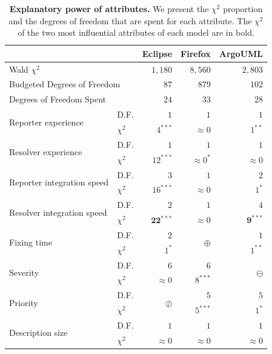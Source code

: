 \begin{table}[t]
	\scriptsize
	\centering
	\caption{\textbf{Explanatory power of attributes.} We present the
		$\chi^2$ proportion and the degrees of freedom that are spent
		for each attribute. The $\chi^2$ of the two most influential
		attributes of each model are in bold.
	\label{ch4:tbl:explanatory_power}}
	\begin{threeparttable}
		\begin{tabular}{llrrr}
			\cline{3-5} 
			\multicolumn{2}{c}{} & 
			Eclipse &
			Firefox &
			ArgoUML
			\tabularnewline
			\hline
			\multicolumn{2}{l}{Wald $\chi^2$} & 
			$1,180$ &
			$8,560$ &
			$2,803$
			\tabularnewline
			\hline 
			\multicolumn{2}{l}{Budgeted Degrees of Freedom} &
			$87$ & 
			$879$ &
			$102$
			\tabularnewline
			\hline
			\multicolumn{2}{l}{Degrees of Freedom Spent} &
			$24$ & 
			$33$ &
			$28$
			\tabularnewline
			\hline 
			\multirow{2}{*}{Reporter experience} & 
			D.F. & 
			$1$ & 
			$1$ &
			$1$
			\tabularnewline 
			& 
			$\chi^2$ & 
			$4^{\ast\ast\ast}$ &  
			$\approx 0$ &
			$1^{\ast\ast}$
			\tabularnewline
			\hline 
			\multirow{2}{*}{Resolver experience} & 
			D.F. & 
			$1$ & 
			$1$ &
			$1$
			\tabularnewline 
			& 
			$\chi^2$ & 
			$12^{\ast\ast\ast}$ & 
			$\approx 0^{\ast}$ &  
			$\approx 0$ 
			\tabularnewline
			\hline 
			\multirow{2}{*}{Reporter integration speed} & 
			D.F. & 
			$3$ & 
			$1$ &
			$2$
			\tabularnewline &
			$\chi^2$ & 
			$16^{\ast\ast\ast}$ &
			$\approx 0$ &
			$1^{\ast}$
			\tabularnewline  
			\hline 
			\multirow{2}{*}{Resolver integration speed} & 
			D.F. & 
			$2$ & 
			$1$ &
			$4$
			\tabularnewline & 
			$\chi^2$ & 
			$\mathbf{22}^{\ast\ast\ast}$ &
			$\approx 0$ &  
			$\mathbf{9}^{\ast\ast\ast}$
			\tabularnewline
			\hline 
			\multirow{2}{*}{Fixing time} & 
			D.F. & 
			$2$ & 
			\multirow{2}{*}{$\oplus$} &
			$1$
			\tabularnewline & 
			$\chi^2$ & 
			$1^{\ast}$ &
			&  
			$1^{\ast\ast}$ 
			\tabularnewline
			\hline 
			\multirow{2}{*}{Severity} & 
			D.F. & 
			$6$ &
			$6$ &
			\multirow{2}{*}{$\ominus$} 
			\tabularnewline & 
			$\chi^2$ &
			$\approx 0$ &
			$8^{\ast\ast\ast}$ &
			\tabularnewline \hline 
			\multirow{2}{*}{Priority} &
			D.F. & 
			\multirow{2}{*}{$\oslash$} & 
			$5$ &
			$5$
			\tabularnewline & 
			$\chi^2$ & 
			&%
			$5^{\ast\ast\ast}$ &  
			$1^{\ast}$  
			\tabularnewline \hline 
			\multirow{2}{*}{Description size} & 
			D.F. & 
			$1$ & 
			$1$ &
			$1$
			\tabularnewline & 
			$\chi^2$ & 
			$\approx 0$ &  
			$\approx 0$ &
			$\approx 0$
			\tabularnewline \hline 

\end{tabular}
\end{threeparttable}
\end{table}
